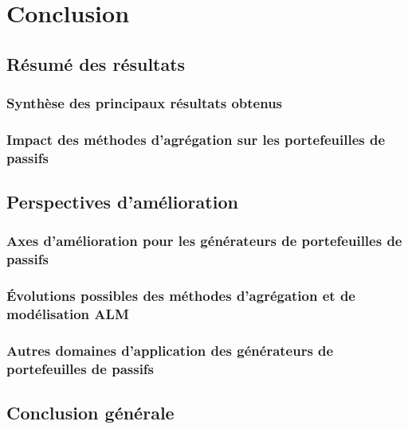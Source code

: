 \chapter{Conclusion}
\section{Résumé des résultats}
\subsection{Synthèse des principaux résultats obtenus}
\subsection{Impact des méthodes d'agrégation sur les portefeuilles de passifs}

\section{Perspectives d'amélioration}
\subsection{Axes d'amélioration pour les générateurs de portefeuilles de passifs}
\subsection{Évolutions possibles des méthodes d'agrégation et de modélisation ALM}  
\subsection{Autres domaines d'application des générateurs de portefeuilles de passifs}
\section{Conclusion générale}
